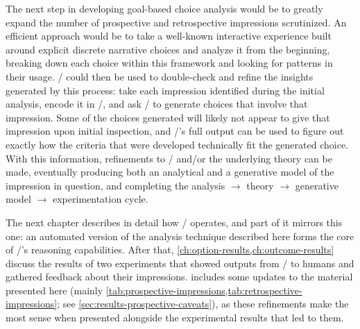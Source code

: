The next step in developing goal-based choice analysis would be to greatly expand the number of prospective and retrospective impressions scrutinized.
%
An efficient approach would be to take a well-known interactive experience built around explicit discrete narrative choices and analyze it from the beginning, breaking down each choice within this framework and looking for patterns in their usage.
%
\dunyazad/ could then be used to double-check and refine the insights generated by this process: take each impression identified during the initial analysis, encode it in \dunyazad/, and ask \dunyazad/ to generate choices that involve that impression.
%
Some of the choices generated will likely not appear to give that impression upon initial inspection, and \dunyazad/'s full output can be used to figure out exactly how the criteria that were developed technically fit the generated choice.
%
With this information, refinements to \dunyazad/ and/or the underlying theory can be made, eventually producing both an analytical and a generative model of the impression in question, and completing the analysis $\rightarrow$ theory $\rightarrow$ generative model $\rightarrow$ experimentation cycle.


The next chapter describes in detail how \dunyazad/ operates, and part of it mirrors this one: an automated version of the analysis technique described here forms the core of \dunyazad/'s reasoning capabilities.
%
After that, \cref{ch:option-results,ch:outcome-results} discuss the results of two experiments that showed outputs from \dunyazad/ to humans and gathered feedback about their impressions.
%
 includes some updates to the material presented here (mainly \cref{tab:prospective-impressions,tab:retrospective-impressions}; see \cref{sec:results-prospective-caveats}), as these refinements make the most sense when presented alongside the experimental results that led to them.
